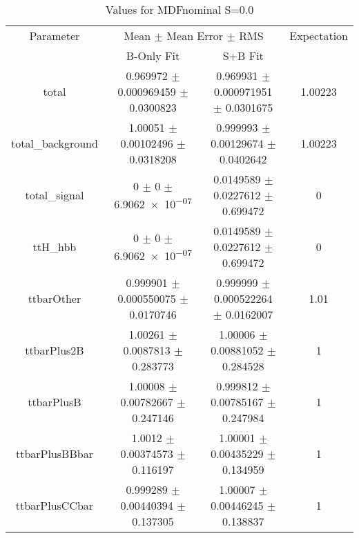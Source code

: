 \begin{table}
\centering
\caption{Values for MDFnominal S=0.0}
\begin{tabular}{cccc}
\toprule
Parameter & \multicolumn{2}{c}{Mean $\pm$ Mean Error $\pm$ RMS} & Expectation\\
 & B-Only Fit & S+B Fit & \\
\midrule
total & \num{0.969972} $\pm$ \num{0.000969459} $\pm$ \num{0.0300823} & \num{0.969931} $\pm$ \num{0.000971951} $\pm$ \num{0.0301675} & \num{1.00223}\\
total\_background & \num{1.00051} $\pm$ \num{0.00102496} $\pm$ \num{0.0318208} & \num{0.999993} $\pm$ \num{0.00129674} $\pm$ \num{0.0402642} & \num{1.00223}\\
total\_signal & \num{0} $\pm$ \num{0} $\pm$ \num{6.9062e-07} & \num{0.0149589} $\pm$ \num{0.0227612} $\pm$ \num{0.699472} & \num{0}\\
ttH\_hbb & \num{0} $\pm$ \num{0} $\pm$ \num{6.9062e-07} & \num{0.0149589} $\pm$ \num{0.0227612} $\pm$ \num{0.699472} & \num{0}\\
ttbarOther & \num{0.999901} $\pm$ \num{0.000550075} $\pm$ \num{0.0170746} & \num{0.999999} $\pm$ \num{0.000522264} $\pm$ \num{0.0162007} & \num{1.01}\\
ttbarPlus2B & \num{1.00261} $\pm$ \num{0.0087813} $\pm$ \num{0.283773} & \num{1.00006} $\pm$ \num{0.00881052} $\pm$ \num{0.284528} & \num{1}\\
ttbarPlusB & \num{1.00008} $\pm$ \num{0.00782667} $\pm$ \num{0.247146} & \num{0.999812} $\pm$ \num{0.00785167} $\pm$ \num{0.247984} & \num{1}\\
ttbarPlusBBbar & \num{1.0012} $\pm$ \num{0.00374573} $\pm$ \num{0.116197} & \num{1.00001} $\pm$ \num{0.00435229} $\pm$ \num{0.134959} & \num{1}\\
ttbarPlusCCbar & \num{0.999289} $\pm$ \num{0.00440394} $\pm$ \num{0.137305} & \num{1.00007} $\pm$ \num{0.00446245} $\pm$ \num{0.138837} & \num{1}\\
\bottomrule
\end{tabular}
\end{table}